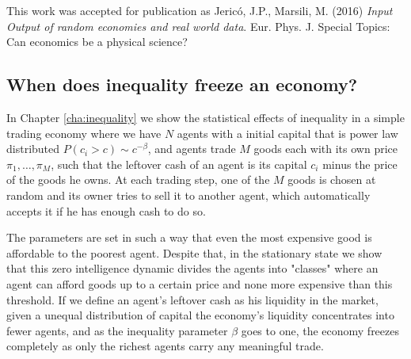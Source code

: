 This work was accepted for publication as Jericó, J.P., Marsili, M. (2016) \emph{Input Output of random economies and real world data}. Eur. Phys. J. Special Topics: Can economics be a physical science?


\subsection{When does inequality freeze an economy?}

In Chapter \ref{cha:inequality} we show the statistical effects of inequality in a simple trading economy where we have $N$ agents with a initial capital that is power law distributed $P(c_i > c) \sim c^{-\beta}$, and agents trade $M$ goods each with its own price $\pi_1, \ldots, \pi_M$, such that the leftover cash of an agent is its capital $c_i$ minus the price of the goods he owns. At each trading step, one of the $M$ goods is chosen at random and its owner tries to sell it to another agent, which automatically accepts it if he has enough cash to do so.

The parameters are set in such a way that even the most expensive good is affordable to the poorest agent. Despite that, in the stationary state we show that this zero intelligence dynamic divides the agents into "classes" where an agent can afford goods up to a certain price and none more expensive than this threshold. If we define an agent's leftover cash as his liquidity in the market, given a unequal distribution of capital the economy's liquidity concentrates into fewer agents, and as the inequality parameter $\beta$ goes to one, the economy freezes completely as only the richest agents carry any meaningful trade.

